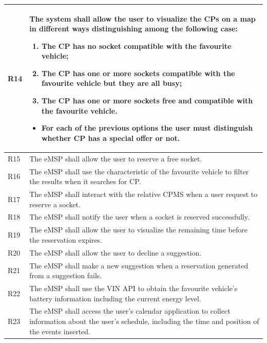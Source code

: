 \documentclass{Configuration_Files/PoliMi3i_thesis}
\begin{document}
\begin{xltabular}{\textwidth}{| >{}l | X |}
R14  &
    The system shall allow the user to visualize the CPs on a map in different ways distinguishing among the following case:
    \begin{enumerate}
        \item The CP has no socket compatible with the favourite vehicle;
        \item The CP has one or more sockets compatible with the favourite vehicle but they are all busy;
        \item The CP has one or more sockets free and compatible with the favourite vehicle.
    \end{enumerate}
    \begin{itemize}
        \item For each of the previous options the user must distinguish whether CP has a special offer or not.
    \end{itemize}\B\\
\hline

R15  &
    The eMSP shall allow the user to reserve a free socket.\B\\
\hline
  
R16  &
    The eMSP shall use the characteristic of the favourite vehicle to filter the results when it searches for CP.\B\\
\hline

R17  &
    The eMSP shall interact with the relative CPMS when a user request to reserve a socket.\B\\
\hline

R18  &
    The eMSP shall notify the user when a socket is reserved successfully.\B\\
\hline
  
R19 &
     The eMSP shall allow the user to visualize the remaining time before the reservation expires.\B\\
\hline

R20  &
    The eMSP shall allow the user to decline  a suggestion.\B\\
\hline

R21  &
    The eMSP shall make a new suggestion when a reservation generated from a suggestion fails.\B\\
\hline

R22  &
    The eMSP shall use the VIN API to obtain the favourite vehicle's battery information including the current energy level.\B\\
\hline

R23  &
    The eMSP shall access the user’s calendar application to collect information about the user’s schedule, including the time and position of the events inserted.\B\\
\hline


\end{xltabular}
\end{document}
